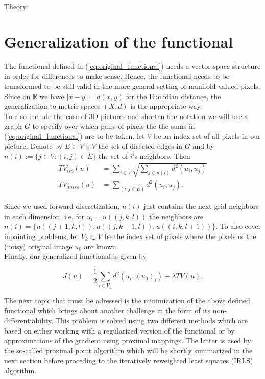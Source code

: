 \begin{chapter}{Theory}
\label{ch:theory}

\section{Generalization of the functional} %
\label{sec:Generalization of the functional}
The functional defined in (\ref{eq:original_functional}) needs a vector space structure in order for differences to make sense. Hence, the functional
needs to be transformed to be still valid in the more general setting of manifold-valued pixels. Since on $\mathbb{R}$ we have $|x-y|=d(x,y)$ for the 
Euclidian distance, the generalization to metric spaces $(X,d)$ is the appropriate way.\\

To also include the case of 3D pictures and shorten the notation we will use a graph $G$ to specify over which pairs of pixels the the sums in (\ref{eq:original_functional})
are to be taken. let $V$ be an index set of all pixels in our picture. Denote by $E\subset V\times V$ the set of directed edges in $G$ and by 
$n(i):=\lbrace j\in V: (i,j)\in E\rbrace$ the set of $i$'s neighbors. Then
\begin{align}
    TV_{iso}(u) &= \sum_{i\in V}\sqrt{\sum_{j\in n(i)}d^{2}(u_i,u_j)}\\
    TV_{aniso}(u) &= \sum_{(i,j\in E)}d^{2}(u_i,u_j).
\end{align}

Since we used forward discretization, $n(i)$ just contains the next grid neighbors in each dimension, i.e. for $u_i=u((j,k,l))$ the neighbors are 
$n(i)=\lbrace u((j+1,k,l)), u((j,k+1,l)), u((i,k,l+1)) \rbrace$. To also cover inpainting problems, let $V_k\subset V$ be the index set of pixels
where the pixels of the (noisy) original image $u_0$ are known.\\ 
Finally, our generalized functional is given by

\begin{equation}
    \label{eq:general_functional}
    J(u)=\frac{1}{2}\sum_{i\in V_k}d^2(u_i,(u_0)_i) +\lambda TV(u).
\end{equation}

The next topic that must be adressed is the minimization of the above defined functional which brings about another challenge in the form of its non-differentiability.
This problem is solved using two different methods which are based on either working with a regularized version of the functional or by approximations of the gradient
using proximal mappings. The latter is used by the so-called proximal point algorithm which will be shortly summarized in the next section before proceding to
the iteratively reweighted least squares (IRLS) algorithm.


\end{chapter}
